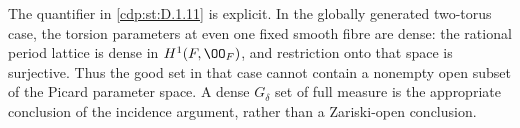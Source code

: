 The quantifier in \ref{cdp:st:D.1.11} is explicit. In the globally generated
two-torus case, the torsion parameters at even one fixed smooth fibre are
dense: the rational period lattice is dense in
$H^1(F,\OO_F)$, and restriction onto that space is surjective.
Thus the good set in that case cannot contain a nonempty open
subset of the Picard parameter space. A dense $G_\delta$ set of
full measure is the appropriate conclusion of the incidence
argument, rather than a Zariski-open conclusion.


